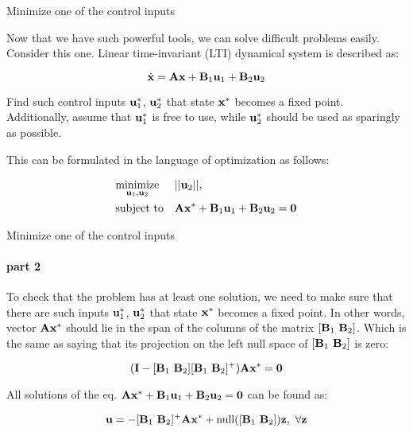 \documentclass{beamer}
\begin{document}
\begin{frame}{Minimize one of the control inputs}
\begin{flushleft}

Now that we have such powerful tools, we can solve difficult problems easily. Consider this one. Linear time-invariant (LTI) dynamical system is described as:

\begin{equation}
    \dot{\mathbf{x}} = \mathbf{A} \mathbf{x} + \mathbf{B}_1 \mathbf{u}_1 + \mathbf{B}_2 \mathbf{u}_2
\end{equation}

Find such control inputs $\mathbf{u}^*_1$, $\mathbf{u}^*_2$ that state $\mathbf{x}^*$ becomes a fixed point. Additionally, assume that $\mathbf{u}^*_1$ is free to use, while $\mathbf{u}^*_2$ should be used as sparingly as possible.

\bigskip

This can be formulated in the language of optimization as follows:

\begin{equation}
\label{eq:task_u1u2}
\begin{aligned}
& \underset{\mathbf{u}_1, \mathbf{u}_2}{\text{minimize}}
& & || \mathbf{u}_2 ||, \\
& \text{subject to}
& & \mathbf{A} \mathbf{x}^* + \mathbf{B}_1 \mathbf{u}_1 + \mathbf{B}_2 \mathbf{u}_2 = \mathbf{0}
\end{aligned}
\end{equation}

\end{flushleft}
\end{frame}


\begin{frame}{Minimize one of the control inputs}
\framesubtitle{part 2}
\begin{flushleft}

To check that the problem has at least one solution, we need to make sure that there are such inputs $\mathbf{u}^*_1$, $\mathbf{u}^*_2$ that state $\mathbf{x}^*$ becomes a fixed point. In other words, vector $\mathbf{A}\mathbf{x}^*$ should lie in the span of the columns of the matrix $[\mathbf{B}_1 \ \mathbf{B}_2]$. Which is the same as saying that its projection on the left null space of $[\mathbf{B}_1 \ \mathbf{B}_2]$ is zero:

\begin{equation}
    (\mathbf{I} - [\mathbf{B}_1 \ \mathbf{B}_2] [\mathbf{B}_1 \ \mathbf{B}_2]^+) \mathbf{A}\mathbf{x}^* = \mathbf{0}
\end{equation}

All solutions of the eq. $\mathbf{A} \mathbf{x}^* + \mathbf{B}_1 \mathbf{u}_1 + \mathbf{B}_2 \mathbf{u}_2 = \mathbf{0}$ can be found as:

\begin{equation}
    \mathbf{u} = - [\mathbf{B}_1 \ \mathbf{B}_2]^+ \mathbf{A}\mathbf{x}^* + \text{null}([\mathbf{B}_1 \ \mathbf{B}_2])\mathbf{z}, \ \forall \mathbf{z}
\end{equation}

\end{flushleft}
\end{frame}
\end{document}
